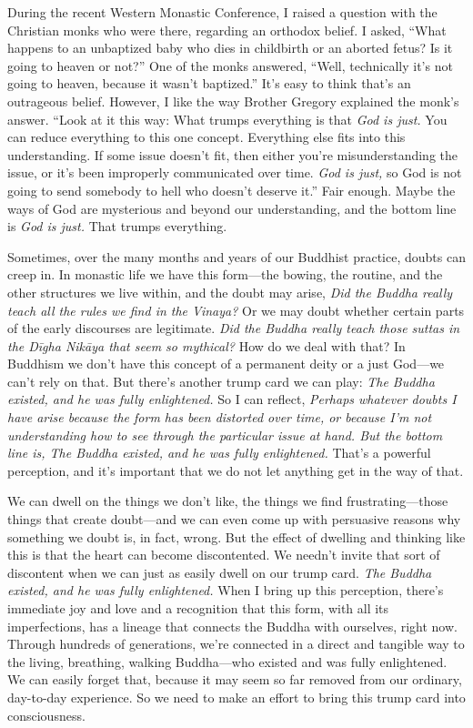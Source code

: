 During the recent Western Monastic Conference, I raised a question with 
the Christian monks who were there, regarding an orthodox belief. I 
asked, ``What happens to an unbaptized baby who dies in childbirth or 
an aborted fetus? Is it going to heaven or not?'' One of the monks 
answered, ``Well, technically it's not going to heaven, because it 
wasn't baptized.'' It's easy to think that's an outrageous belief. 
However, I like the way Brother Gregory explained the monk's answer. 
``Look at it this way: What trumps everything is that \emph{God is 
just.} You can reduce everything to this one concept. Everything else 
fits into this understanding. If some issue doesn't fit, then either 
you're misunderstanding the issue, or it's been improperly communicated 
over time. \emph{God is just,} so God is not going to send somebody to 
hell who doesn't deserve it.'' Fair enough. Maybe the ways of God are 
mysterious and beyond our understanding, and the bottom line is 
\emph{God is just.} That trumps everything.

Sometimes, over the many months and years of our Buddhist practice, 
doubts can creep in. In monastic life we have this form---the bowing, 
the routine, and the other structures we live within, and the doubt may 
arise, \emph{Did the Buddha really teach all the rules we find in the 
Vinaya?} Or we may doubt whether certain parts of the early discourses 
are legitimate. \emph{Did the Buddha really teach those suttas in the 
Dīgha Nikāya that seem so mythical?} How do we deal with that? In 
Buddhism we don't have this concept of a permanent deity or a just 
God---we can't rely on that. But there's another trump card we can 
play: \emph{The Buddha existed, and he was fully enlightened.} So I can 
reflect, \emph{Perhaps whatever doubts I have arise because the form 
has been distorted over time, or because I'm not understanding how to 
see through the particular issue at hand. But the bottom line is, The 
Buddha existed, and he was fully enlightened.} That's a powerful 
perception, and it's important that we do not let anything get in the 
way of that.

We can dwell on the things we don't like, the things we find 
frustrating---those things that create doubt---and we can even come up 
with persuasive reasons why something we doubt is, in fact, wrong. But 
the effect of dwelling and thinking like this is that the heart can 
become discontented. We needn't invite that sort of discontent when we 
can just as easily dwell on our trump card. \emph{The Buddha existed, 
and he was fully enlightened.} When I bring up this perception, there's 
immediate joy and love and a recognition that this form, with all its 
imperfections, has a lineage that connects the Buddha with ourselves, 
right now. Through hundreds of generations, we're connected in a direct 
and tangible way to the living, breathing, walking Buddha---who existed 
and was fully enlightened. We can easily forget that, because it may 
seem so far removed from our ordinary, day-to-day experience. So we 
need to make an effort to bring this trump card into consciousness.

